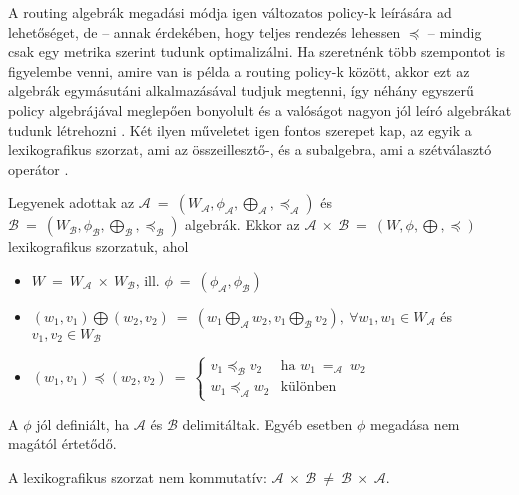   A routing algebrák megadási módja igen változatos policy-k leírására ad lehetőséget, de -- annak érdekében, hogy teljes rendezés lehessen $\preceq$ -- mindig csak egy metrika szerint tudunk optimalizálni. Ha szeretnénk több szempontot is figyelembe venni, amire van is példa a routing policy-k között, akkor ezt az algebrák egymásutáni alkalmazásával tudjuk megtenni, így néhány egyszerű policy algebrájával meglepően bonyolult és a valóságot nagyon jól leíró algebrákat tudunk létrehozni \cite{Sobrinho_Metarouting}. Két ilyen műveletet igen fontos szerepet kap, az egyik a lexikografikus szorzat, ami az összeillesztő-, és a subalgebra, ami a szétválasztó operátor \cite{Lexicographic_products_in_metarouting}.

  \begin{definition} 
    Legyenek adottak az $\mathcal{A}~=~(W_{\mathcal{A}},\phi_{\mathcal{A}},\bigoplus_{\mathcal{A}}, \preceq_{\mathcal{A}})$ és\\ $\mathcal{B}~=~(W_{\mathcal{B}},\phi_{\mathcal{B}},\bigoplus_{\mathcal{B}},\preceq_{\mathcal{B}})$ algebrák. Ekkor az $\mathcal{A}~\times~\mathcal{B}~=~(W,\phi,\bigoplus,\preceq)$ lexikografikus szorzatuk, ahol
    \begin{itemize}
    \item $W~=~W_{\mathcal{A}}~\times~W_{\mathcal{B}}$, ill. $\phi ~=~ (\phi_{\mathcal{A}}, \phi_{\mathcal{B}})$
    \item $(w_{1},v_{1}) \bigoplus (w_{2},v_{2})~=~ (w_{1} \bigoplus_{\mathcal{A}} w_{2},v_{1} \bigoplus_{\mathcal{B}} v_{2}),~\forall w_{1},w_{1} \in W_{\mathcal{A}}$ és $v_{1}, v_{2} \in W_{\mathcal{B}}$
    \item $(w_{1},v_{1}) \preceq (w_{2}, v_{2})~=~
    \begin{cases}
      v_{1} \preceq_{\mathcal{B}} v_{2} & \text{ha } w_{1}~=_{\mathcal{A}}~w_{2} \\
      w_{1} \preceq_{\mathcal{A}} w_{2} & \text{különben}
    \end{cases}$
    \end{itemize}
  \end{definition}

  \begin{note}
    A $\phi$ jól definiált, ha $\mathcal{A}$ és $\mathcal{B}$ delimitáltak. Egyéb esetben $\phi$ megadása nem magától értetődő.
  \end{note}
  \begin{note}
    A lexikografikus szorzat nem kommutatív: $\mathcal{A}~\times~\mathcal{B}~\neq~\mathcal{B}~\times~\mathcal{A}$.
  \end{note}

